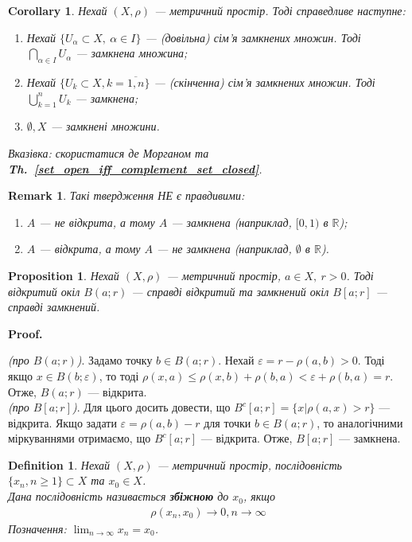 \documentclass[a4paper, 10pt]{article}
\makeatletter
\theoremstyle{theoremdd}
\theoremstyle{theoremdd}
\newtheorem{definition}[theorem]{Definition}
\theoremstyle{theoremdd}
\theoremstyle{theoremdd}
\theoremstyle{theoremdd}
\newtheorem{proposition}[theorem]{Proposition}
\theoremstyle{theoremdd}
\newtheorem{remark}[theorem]{Remark}
\theoremstyle{theoremdd}
\theoremstyle{theoremdd}
\newtheorem{corollary}[theorem]{Corollary}
\newcommand\thref[1]{\textbf{Th.~\ref{#1}}}
\renewenvironment{proof}[1][Proof.\\]{\par
\pushQED{\hfill \qed}%
\normalfont \topsep6\p@\@plus6\p@\relax
\trivlist
\item\relax
{\bfseries
#1\@addpunct{.}}\hspace\labelsep\ignorespaces
}{%
\popQED\endtrivlist\@endpefalse
}
\makeatother
\begin{document}
\begin{corollary}
Нехай $(X,\rho)$ --- метричний простір. Тоді справедливе наступне:
\begin{enumerate}[nosep,wide=0pt,label={\arabic*)}]
\item Нехай $\{U_{\alpha} \subset X,\ \alpha \in I\}$ --- (довільна) сім'я замкнених множин. Тоді $\displaystyle \bigcap_{\alpha \in I} U_{\alpha}$ --- замкнена множина;
\item Нехай $\{U_k \subset X, k = \overline{1,n}\}$ --- (скінченна) сім'я замкнених множин. Тоді $\displaystyle \bigcup_{k=1}^n U_k$ --- замкнена;
\item $\emptyset, X$ --- замкнені множини.
\end{enumerate}
\textit{Вказівка: скористатися де Морганом та \thref{set_open_iff_complement_set_closed}.}
\end{corollary}

\begin{remark} Такі твердження НЕ є правдивими:
\begin{enumerate}[nosep,wide=0pt,label={\arabic*)}]
\item $A$ --- не відкрита, а тому $A$ --- замкнена (наприклад, $[0,1)$ в $\mathbb{R}$);
\item $A$ --- відкрита, а тому $A$ --- не замкнена (наприклад, $\emptyset$ в $\mathbb{R}$).
\end{enumerate}
\end{remark}

\begin{proposition}
Нехай $(X,\rho)$ --- метричний простір, $a \in X,\ r > 0$. Тоді відкритий окіл $B(a;r)$ --- справді відкритий та замкнений окіл $B[a;r]$ --- справді замкнений.
\end{proposition}

\begin{proof}
\textit{(про $B(a;r)$)}. Задамо точку $b \in B(a;r)$. Нехай $\varepsilon = r - \rho(a,b) > 0$. Тоді якщо $x \in B(b; \varepsilon)$, то тоді $\rho(x, a) \leq \rho(x, b) + \rho(b, a) < \varepsilon + \rho(b,a) = r$. Отже, $B(a;r)$ --- відкрита.
\bigskip \\
\textit{(про $B[a;r]$)}. Для цього досить довести, що $B^c[a;r] = \{x | \rho(a,x) > r\}$ --- відкрита. Якщо задати $\varepsilon = \rho(a,b) - r$ для точки $b \in B(a;r)$, то аналогічними міркуваннями отримаємо, що $B^c[a;r]$ --- відкрита. Отже, $B[a;r]$ --- замкнена.
\end{proof}

\begin{definition}
Нехай $(X,\rho)$ --- метричний простір, послідовність $\{x_n, n \geq 1\} \subset X$ та $x_0 \in X$.\\
Дана послідовність називається \textbf{збіжною} до $x_0$, якщо
\begin{align*}
\rho(x_n, x_0) \to 0, n \to \infty
\end{align*}
Позначення: $\displaystyle\lim_{n \to \infty} x_n = x_0$.
\end{definition}
\end{document}
